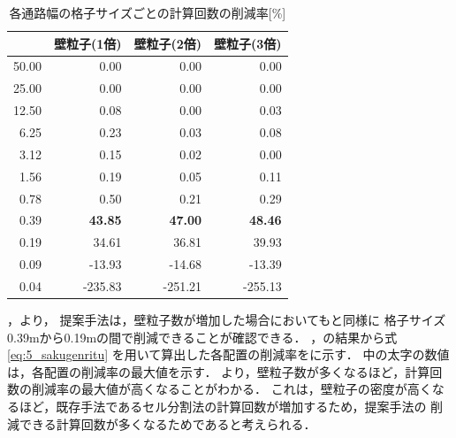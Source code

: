 \begin{table}[tb]
  \centering
  \caption{各通路幅の格子サイズごとの計算回数の削減率[\%]}
  \label{tb:5_bai_sakugenritu}
    \begin{tabular}{r|r|r|r}
    \hline \hline
		      & 壁粒子(1倍)    & 壁粒子(2倍)      & 壁粒子(3倍)        \\ \hline
		50.00 & 0.00           & 0.00             & 0.00               \\ \hline
		25.00 & 0.00           & 0.00             & 0.00               \\ \hline
		12.50 & 0.08           & 0.00             & 0.03               \\ \hline
		 6.25 & 0.23           & 0.03             & 0.08               \\ \hline
		 3.12 & 0.15           & 0.02             & 0.00               \\ \hline
		 1.56 & 0.19           & 0.05             & 0.11               \\ \hline
		 0.78 & 0.50           & 0.21             & 0.29               \\ \hline
		 0.39 & \textbf{43.85} & \textbf{47.00}   & \textbf{48.46}     \\ \hline
		 0.19 & 34.61          & 36.81            & 39.93              \\ \hline
		 0.09 & -13.93         & -14.68           & -13.39             \\ \hline
		 0.04 & -235.83        & -251.21          & -255.13            \\ \hline
    \end{tabular}
\end{table}

，より，
提案手法は，壁粒子数が増加した場合においてもと同様に
格子サイズ0.39mから0.19mの間で削減できることが確認できる．
，の結果から式\eqref{eq:5_sakugenritu}
を用いて算出した各配置の削減率をに示す．
中の太字の数値は，各配置の削減率の最大値を示す．
より，壁粒子数が多くなるほど，計算回数の削減率の最大値が高くなることがわかる．
これは，壁粒子の密度が高くなるほど，既存手法であるセル分割法の計算回数が増加するため，提案手法の
削減できる計算回数が多くなるためであると考えられる．

\clearpage
